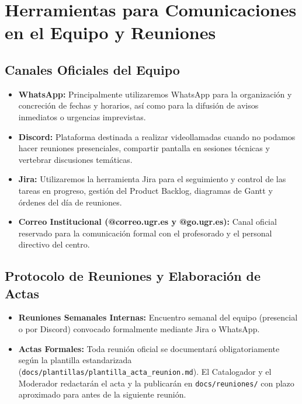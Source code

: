 \section{Herramientas para Comunicaciones en el Equipo y Reuniones}

\subsection{Canales Oficiales del Equipo}
\begin{itemize}[leftmargin=*]
  \item \textbf{WhatsApp:} Principalmente utilizaremos WhatsApp para la organización y concreción de fechas y horarios, así como para la difusión de avisos inmediatos o urgencias imprevistas.
  \item \textbf{Discord:} Plataforma destinada a realizar videollamadas cuando no podamos hacer reuniones presenciales, compartir pantalla en sesiones técnicas y vertebrar discusiones temáticas.
  \item \textbf{Jira:} Utilizaremos la herramienta Jira para el seguimiento y control de las tareas en progreso, gestión del Product Backlog, diagramas de Gantt y órdenes del día de reuniones.
  \item \textbf{Correo Institucional (@correo.ugr.es y @go.ugr.es):} Canal oficial reservado para la comunicación formal con el profesorado y el personal directivo del centro.
\end{itemize}

\subsection{Protocolo de Reuniones y Elaboración de Actas}
\begin{itemize}[leftmargin=*]
  \item \textbf{Reuniones Semanales Internas:} Encuentro semanal del equipo (presencial o por Discord) convocado formalmente mediante Jira o WhatsApp.
  \item \textbf{Actas Formales:} Toda reunión oficial se documentará obligatoriamente según la plantilla estandarizada (\texttt{docs/plantillas/plantilla\_acta\_reunion.md}). El Catalogador y el Moderador redactarán el acta y la publicarán en \texttt{docs/reuniones/} con plazo aproximado para antes de la siguiente reunión.
\end{itemize}
